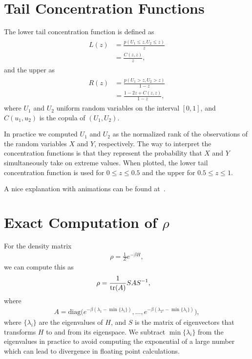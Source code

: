 \section{Tail Concentration Functions}\label{app:tail_concentration_functions}
The lower tail concentration function is defined as~\cite{venter_2002}
\begin{align}
\begin{split}
    L(z)
        &= \frac{p(U_1 \le z, U_2 \le z)}{z} \\
        &= \frac{C(z,z)}{z},
\end{split}
\end{align}
and the upper as
\begin{align}
\begin{split}
    R(z)
        &= \frac{p(U_1 > z, U_2 > z)}{1-z} \\
        &= \frac{1 - 2z + C(z,z)}{1-z},
\end{split}
\end{align}
where \( U_1 \) and \( U_2 \) uniform random variables on the interval \( [0, 1] \), and \( C(u_1, u_2) \) is the copula of \( (U_1, U_2) \).

In practice we computed \( U_1 \) and \( U_2 \) as the normalized rank of the observations of the random variables \( X \) and \( Y \), respectively.
The way to interpret the concentration functions is that they represent the probability that \( X \) and \( Y \) simultaneously take on extreme values.
When plotted, the lower tail concentration function is used for \( 0 \le z \le 0.5 \) and the upper for \( 0.5 \le z \le 1 \).

A nice explanation with animations can be found at~\cite{charpentier_2012}.

\section{Exact Computation of \( \rho \)}\label{app:exact_rho_computation}
For the density matrix
\begin{align}
    \rho = \frac{1}{Z} e^{-\beta H},
\end{align}
we can compute this as
\begin{align}
    \rho
        &= \frac{1}{\text{tr}(A)} S A S^{-1},
\end{align}
where
\begin{align}
    A = \text{diag}\Big(e^{-\beta(\lambda_1 - \min\{\lambda_i\})}, \dots, e^{-\beta(\lambda_{2^n} - \min\{\lambda_i\})}\Big),
\end{align}
where \( \{\lambda_i\} \) are the eigenvalues of \( H \), and \( S \) is the matrix of eigenvectors that transforms \( H \) to and from its eigenspace.
We subtract \( \min\{\lambda_i\} \) from the eigenvalues in practice to avoid computing the exponential of a large number which can lead to divergence in floating point calculations.

